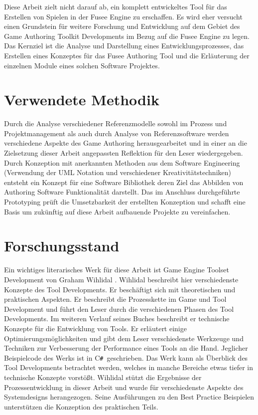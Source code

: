 \documentclass[pagesize, paper=a4, fontsize=12pt, titlepage=true, headings=small, headnosepline, abstractoff, liststotoc, nochapterprefix, plainheadsepline, twoside]{scrreprt}
\newcommand{\CSS}{C\texttt{\# }}
\begin{document}
Diese Arbeit zielt nicht darauf ab, ein komplett entwickeltes Tool für das Erstellen von Spielen in der Fusee Engine zu erschaffen. Es wird eher versucht einen Grundstein für weitere Forschung und Entwicklung auf dem Gebiet des Game Authoring Toolkit Developments im Bezug auf die Fusee Engine zu legen. Das Kernziel ist die Analyse und Darstellung eines Entwicklungsprozesses, das Erstellen eines Konzeptes für das Fusee Authoring Tool und die Erläuterung der einzelnen Module eines solchen Software Projektes.

\section{Verwendete Methodik}
Durch die Analyse verschiedener Referenzmodelle sowohl im Prozess und Projektmanagement als auch durch Analyse von Referenzsoftware werden verschiedene Aspekte des Game Authoring herausgearbeitet und in einer an die Zielsetzung dieser Arbeit angepassten Reflektion für den Leser wiedergegeben.
Durch Konzeption mit anerkannten Methoden aus dem Software Engineering (Verwendung der UML Notation und verschiedener Kreativitätstechniken) entsteht ein Konzept für eine Software Bibliothek deren Ziel das Abbilden von Authoring Software Funktionalität darstellt.
Das im Anschluss durchgeführte Prototyping prüft die Umsetzbarkeit der erstellten Konzeption und schafft eine Basis um zukünftig auf diese Arbeit aufbauende Projekte zu vereinfachen.

\section{Forschungsstand}
Ein wichtiges literarisches Werk für diese Arbeit ist Game Engine Toolset Development von Graham Wihlidal \parencite{Wihlidal2006}.  Wihlidal beschreibt hier verschiedenste Konzepte des Tool Developments. Er beschäftigt sich mit theoretischen und praktischen Aspekten. Er beschreibt die Prozesskette im Game und Tool Development und führt den Leser durch die verschiedenen Phasen des Tool Developments. Im weiteren Verlauf seines Buches beschreibt er technische Konzepte für die Entwicklung von Tools. Er erläutert einige Optimierungsmöglichkeiten und gibt dem Leser verschiedenste Werkzeuge und Techniken zur Verbesserung der Performance eines Tools an die Hand. Jeglicher Beispielcode des Werks ist in \CSS geschrieben. Das Werk kann als Überblick des Tool Developments betrachtet werden, welches in manche Bereiche etwas tiefer in technische Konzepte vorstößt. Wihlidal stützt die Ergebnisse der Prozessentwicklung in dieser Arbeit und wurde für verschiedenste Aspekte des Systemdesigns herangezogen. Seine Ausführungen zu den Best Practice Beispielen unterstützen die Konzeption des praktischen Teils.
\end{document}
